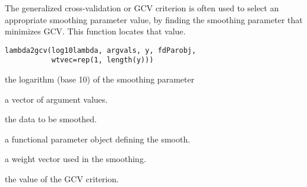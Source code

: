 \begin{Description}\relax
The generalized cross-validation or GCV criterion is often
used to select an appropriate smoothing parameter value, by
finding the smoothing parameter that minimizes GCV.  This
function locates that value.
\end{Description}
\begin{Usage}
\begin{verbatim}
lambda2gcv(log10lambda, argvals, y, fdParobj,
           wtvec=rep(1, length(y)))
\end{verbatim}
\end{Usage}
\begin{Arguments}
\begin{ldescription}
\item[\code{log10lambda}] the logarithm (base 10) of the smoothing parameter

\item[\code{argvals}] a vector of argument values.

\item[\code{y}] the data to be smoothed.

\item[\code{fdParobj}] a functional parameter object defining the smooth.

\item[\code{wtvec}] a weight vector used in the smoothing.

\end{ldescription}
\end{Arguments}
\begin{Value}
the value of the GCV criterion.
\end{Value}

